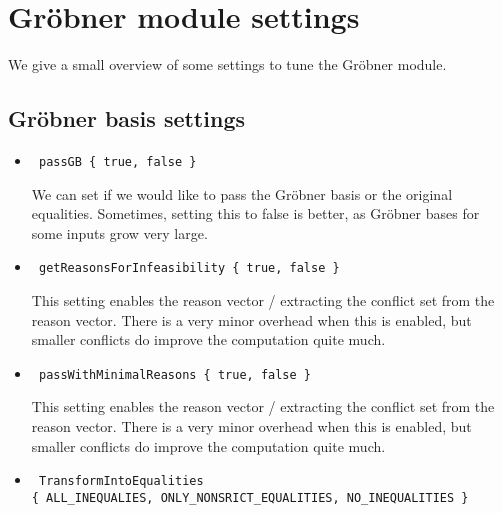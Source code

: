 
\chapter{Gr\"obner module settings} \label{App:Gbsettings}
We give a small overview of some settings to tune the Gr\"obner module.
\section*{Gr\"obner basis settings}
\begin{itemize}
 \item \small{\begin{verbatim} passGB { true, false } \end{verbatim}} 
 We can set if we would like to pass the Gr\"obner basis or the original equalities. Sometimes, setting this to false is better, as Gr\"obner bases for some inputs grow very large.
 \item \small{\begin{verbatim} getReasonsForInfeasibility { true, false } \end{verbatim}}
 This setting enables the reason vector / extracting the conflict set from the reason vector. There is a very minor overhead when this is enabled, but smaller conflicts do improve the computation quite much.
 \item \small{\begin{verbatim} passWithMinimalReasons { true, false } \end{verbatim}}
 This setting enables the reason vector / extracting the conflict set from the reason vector. There is a very minor overhead when this is enabled, but smaller conflicts do improve the computation quite much.
\item \small{\begin{verbatim} TransformIntoEqualities 
{ ALL_INEQUALIES, ONLY_NONSRICT_EQUALITIES, NO_INEQUALITIES } \end{verbatim}} 


\end{itemize}
